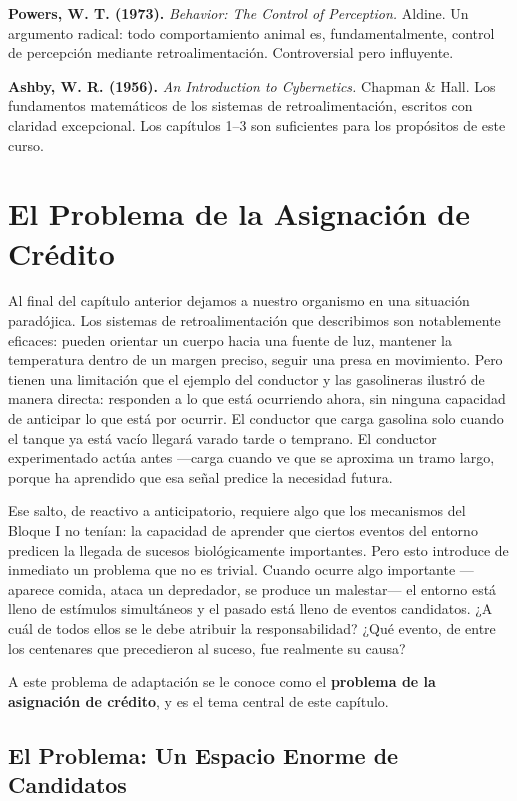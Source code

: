 \documentclass[
  letterpaper,
  DIV=11,
  numbers=noendperiod]{scrreprt}
\begin{document}
\begin{tcolorbox}[enhanced jigsaw, toprule=.15mm, arc=.35mm, colback=white, opacityback=0, colframe=quarto-callout-note-color-frame, breakable, rightrule=.15mm, left=2mm, leftrule=.75mm, bottomrule=.15mm]
\textbf{Powers, W. T. (1973).} \emph{Behavior: The Control of
Perception.} Aldine. Un argumento radical: todo comportamiento animal
es, fundamentalmente, control de percepción mediante retroalimentación.
Controversial pero influyente.

\textbf{Ashby, W. R. (1956).} \emph{An Introduction to Cybernetics.}
Chapman \& Hall. Los fundamentos matemáticos de los sistemas de
retroalimentación, escritos con claridad excepcional. Los capítulos 1--3
son suficientes para los propósitos de este curso.


\chapter{El Problema de la Asignación de
Crédito}\label{el-problema-de-la-asignaciuxf3n-de-cruxe9dito-1}

Al final del capítulo anterior dejamos a nuestro organismo en una
situación paradójica. Los sistemas de retroalimentación que describimos
son notablemente eficaces: pueden orientar un cuerpo hacia una fuente de
luz, mantener la temperatura dentro de un margen preciso, seguir una
presa en movimiento. Pero tienen una limitación que el ejemplo del
conductor y las gasolineras ilustró de manera directa: responden a lo
que está ocurriendo ahora, sin ninguna capacidad de anticipar lo que
está por ocurrir. El conductor que carga gasolina solo cuando el tanque
ya está vacío llegará varado tarde o temprano. El conductor
experimentado actúa antes ---carga cuando ve que se aproxima un tramo
largo, porque ha aprendido que esa señal predice la necesidad futura.

Ese salto, de reactivo a anticipatorio, requiere algo que los mecanismos
del Bloque I no tenían: la capacidad de aprender que ciertos eventos del
entorno predicen la llegada de sucesos biológicamente importantes. Pero
esto introduce de inmediato un problema que no es trivial. Cuando ocurre
algo importante ---aparece comida, ataca un depredador, se produce un
malestar--- el entorno está lleno de estímulos simultáneos y el pasado
está lleno de eventos candidatos. ¿A cuál de todos ellos se le debe
atribuir la responsabilidad? ¿Qué evento, de entre los centenares que
precedieron al suceso, fue realmente su causa?

A este problema de adaptación se le conoce como el \textbf{problema de
la asignación de crédito}, y es el tema central de este capítulo.

\section{El Problema: Un Espacio Enorme de
Candidatos}\label{el-problema-un-espacio-enorme-de-candidatos}


\end{tcolorbox}
\end{document}
